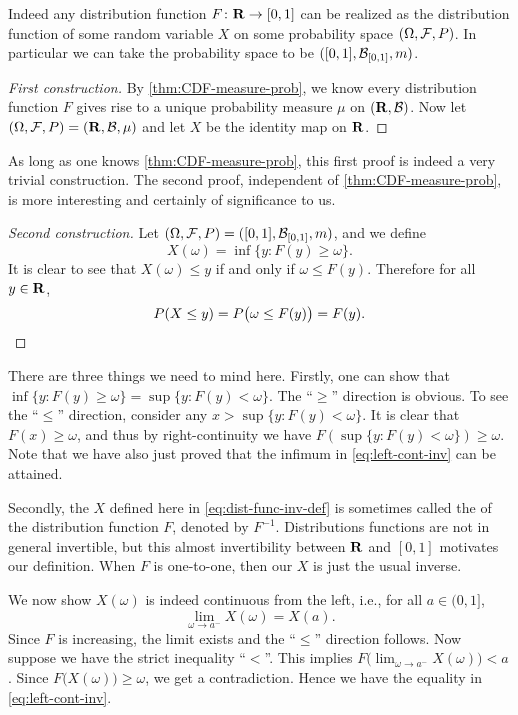 \begin{thm}
    Indeed any distribution function $F \colon \mathbf{R} \to [0,1]$ can be realized as the distribution function of some random variable $X$ on some probability space $(\Omega,\mathcal{F},P)$. In particular we can take the probability space to be $([0,1],\mathcal{B}_{[0,1]},m)$.
\end{thm}
\begin{proof}[First construction]
    By \cref{thm:CDF-measure-prob}, we know every distribution function $F$ gives rise to a unique probability measure $\mu$ on $(\mathbf{R},\mathcal{B})$. Now let $(\Omega,\mathcal{F},P) = (\mathbf{R},\mathcal{B},\mu)$ and let $X$ be the identity map on $\mathbf{R}$.
\end{proof}
As long as one knows \cref{thm:CDF-measure-prob}, this first proof is indeed a very trivial construction. The second proof, independent of \cref{thm:CDF-measure-prob}, is more interesting and certainly of significance to us.
\begin{proof}[Second construction]
    Let $(\Omega,\mathcal{F},P) = ([0,1],\mathcal{B}_{[0,1]},m)$, and we define \begin{equation}
        X(\omega) = \inf\{y : F(y) \geq \omega\}. \label{eq:dist-func-inv-def}
    \end{equation}
    It is clear to see that $X(\omega) \leq y$ if and only if $\omega \leq F(y)$. Therefore for all $y\in \mathbf{R}$, \[
        P(X \leq y) = P\bigl(\omega\leq F(y)\bigr) = F(y).\qedhere
    \]
    
\end{proof}

There are three things we need to mind here. Firstly, one can show that $\inf\{y : F(y) \geq \omega\} = \sup\{y : F(y) < \omega\}$. The ``$\geq$'' direction is obvious. To see the ``$\leq$'' direction, consider any $x > \sup\{y : F(y) < \omega\}$. It is clear that $F(x) \geq \omega$, and thus by right-continuity we have $F(\sup\{y : F(y) < \omega\})\geq \omega$. Note that we have also just proved that the infimum in \eqref{eq:left-cont-inv} can be attained.    

Secondly, the $X$ defined here in \eqref{eq:dist-func-inv-def} is sometimes called the  of the distribution function $F$, denoted by $F^{-1}$. Distributions functions are not in general invertible, but this almost invertibility between $\mathbf{R}$ and $[0,1]$ motivates our definition. When $F$ is one-to-one, then our $X$ is just the usual inverse.

We now show $X(\omega)$ is indeed continuous from the left, i.e., for all $a \in (0,1]$, \begin{equation}
    \lim_{\omega \to a^-} X(\omega) = X(a) \label{eq:left-cont-inv}.
\end{equation} Since $F$ is increasing, the limit exists and the ``$\leq$'' direction follows. Now suppose we have the strict inequality ``$<$''. This implies $F\bigl(\lim_{\omega \to a^-} X(\omega)\bigr) < a$. Since $F\bigl(X(\omega)\bigr) \geq \omega$, we get a contradiction. Hence we have the equality in \eqref{eq:left-cont-inv}.

